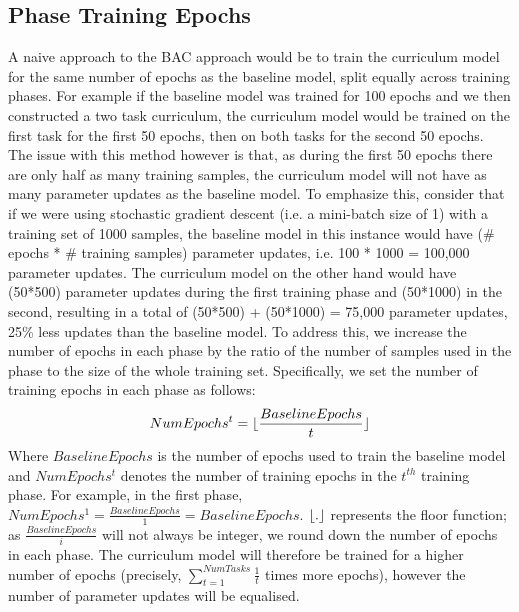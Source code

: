 \subsection{Phase Training Epochs}
A naive approach to the BAC approach would be to train the curriculum model for the same number of epochs as the baseline model, split equally across training phases. For example if the baseline model was trained for 100 epochs and we then constructed a two task curriculum, the curriculum model would be trained on the first task for the first 50 epochs, then on both tasks for the second 50 epochs. The issue with this method however is that, as during the first 50 epochs there are only half as many training samples, the curriculum model will not have as many parameter updates as the baseline model. To emphasize this, consider that if we were using stochastic gradient descent (i.e. a mini-batch size of 1) with a training set of 1000 samples, the baseline model in this instance would have (\# epochs * \# training samples) parameter updates, i.e. 100 * 1000 = 100,000 parameter updates. The curriculum model on the other hand would have (50*500) parameter updates during the first training phase and (50*1000) in the second, resulting in a total of   (50*500) + (50*1000) = 75,000 parameter updates, 25\% less updates than the baseline model. To address this, we increase the number of epochs in each phase by the ratio of the number of samples used in the phase to the size of the whole training set. Specifically, we set the number of training epochs in each phase as follows:
\begin{equation}\label{eq:BAC_Epochs}
NumEpochs^{t} =\lfloor \frac{BaselineEpochs}{t}\rfloor
\end{equation}
Where $BaselineEpochs$ is the number of epochs used to train the baseline model and $NumEpochs^{t}$ denotes the number of training epochs in the $t^{th}$ training phase. For example, in the first phase, $NumEpochs^{1} = \frac{BaselineEpochs}{1} = BaselineEpochs$. $\lfloor.\rfloor$ represents the floor function; as $\frac{BaselineEpochs}{i}$ will not always be integer, we round down the number of epochs in each phase. The curriculum model will therefore be trained for a higher number of epochs (precisely, $\sum_{t=1}^{NumTasks}{\frac{1}{t}}$ times more epochs), however the number of parameter updates will be equalised. 

